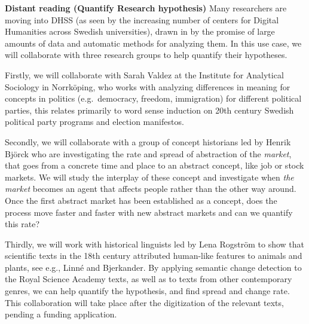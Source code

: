 \documentclass[12pt,twoside,a4paper]{article}
\newcommand\eg{{e.g.\ }}
\begin{document}
\textbf{Distant reading (Quantify Research hypothesis)}
		Many researchers are moving into DHSS (as seen by the increasing number of centers for Digital Humanities across Swedish universities), drawn in by the promise of large amounts of data and automatic methods for analyzing them.  %
	 In this use case, we will collaborate with three research groups to help quantify their hypotheses.
	
   Firstly, we will collaborate with Sarah Valdez at the Institute for Analytical Sociology in Norr\-köping, who works with analyzing differences in meaning for concepts in politics (\eg democracy, freedom, immigration) for different political parties, this relates primarily to word sense induction on 20th century Swedish political party programs and election manifestos.
    
   Secondly, we will collaborate with a group of concept historians led by Henrik Björck who are investigating the rate and spread of abstraction of the \textit{market}, that goes from a concrete time and place to an abstract concept, like job or stock markets. We will study the interplay of these concept and investigate when \textit{the market} becomes an agent that affects people rather than the other way around. Once the first abstract market has been established as a concept, does the process move faster and faster with new abstract markets and can we quantify this rate?
% 
% 
	
	Thirdly, we will work with historical linguists led by Lena Rogström to show that scientific texts in the 18th century attributed human-like features to animals and plants, see e.g., Linné and Bjerkander. By applying semantic change detection to the Royal Science Academy texts, as well as to texts from other contemporary genres, we can help quantify the hypothesis, and find spread and change rate. This collaboration will take place after the digitization of the relevant texts, pending a funding application. 
   
\end{document}
